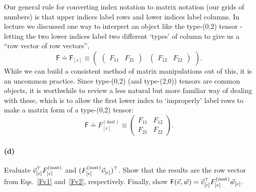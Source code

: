 \documentclass{article}
\def\mat{(\textrm{mat})}
\begin{document}
Our general rule for converting index notation to matrix notation (our grids of numbers) is that upper indices label rows and lower indices label columns.  In lecture we discussed
one way to interpret an object like the type-(0,2) tensor - letting the two lower indices label two different `types' of column to give us a ``row vector of row vectors'',
	\begin{equation*}
		\mathsf{F}\doteq\mathsf{F}_{[e]} \equiv \begin{pmatrix} \begin{pmatrix} F_{11} & F_{21} \end{pmatrix} & \begin{pmatrix} F_{12} & F_{22} \end{pmatrix} \end{pmatrix}.
	\end{equation*}
While we can build a consistent method of matrix manipulations out of this, it is an uncommon practice.  Since type-(0,2) (and type-(2,0)) tensors are common objects, it
is worthwhile to review a less natural but more familiar way of dealing with these, which is to allow the first lower index to `improperly' label rows to make a matrix
form of a type-(0,2) tensor:
	\begin{equation*}
		\mathsf{F}\doteq {F}^{\mat}_{[e]} \equiv \begin{pmatrix} F_{11} & F_{12} \\ F_{21} & F_{22}\end{pmatrix}.
	\end{equation*}

\paragraph{(d)}	
Evaluate $\vec{v}_{[e]}^{\T}{F}^{\mat}_{[e]}$ and $({F}^{(\textrm{mat})}_{[e]}\vec{v}_{[e]})^{\top}$.  Show that the results are the row vector from Eqs.~\ref{Fv1} and~\ref{Fv2}, respectively.
Finally, show $\mathsf{F}(\vec{v},\vec{w}) = \vec{v}_{[e]}^{\top}{F}^{(\textrm{mat})}_{[e]}\vec{w}_{[e]}$.
\end{document}
